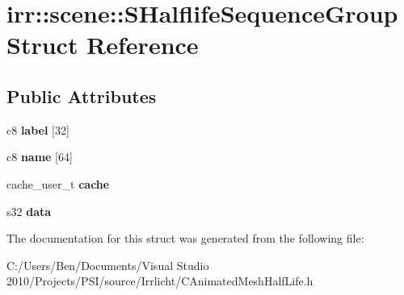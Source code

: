 \hypertarget{structirr_1_1scene_1_1_s_halflife_sequence_group}{\section{irr\-:\-:scene\-:\-:S\-Halflife\-Sequence\-Group Struct Reference}
\label{structirr_1_1scene_1_1_s_halflife_sequence_group}
}
\subsection*{Public Attributes}
\begin{DoxyCompactItemize}
\item 
\hypertarget{structirr_1_1scene_1_1_s_halflife_sequence_group_a7489c571626814da1c0ad6c0d033d3e6}{c8 {\bfseries label} \mbox{[}32\mbox{]}}\label{structirr_1_1scene_1_1_s_halflife_sequence_group_a7489c571626814da1c0ad6c0d033d3e6}

\item 
\hypertarget{structirr_1_1scene_1_1_s_halflife_sequence_group_adfc62ea01b69af2a6615a80af762e618}{c8 {\bfseries name} \mbox{[}64\mbox{]}}\label{structirr_1_1scene_1_1_s_halflife_sequence_group_adfc62ea01b69af2a6615a80af762e618}

\item 
\hypertarget{structirr_1_1scene_1_1_s_halflife_sequence_group_a185915a04865ca83ff2ada96beb50bd1}{cache\-\_\-user\-\_\-t {\bfseries cache}}\label{structirr_1_1scene_1_1_s_halflife_sequence_group_a185915a04865ca83ff2ada96beb50bd1}

\item 
\hypertarget{structirr_1_1scene_1_1_s_halflife_sequence_group_a440513555ef0f3d6264ebac1f145afa2}{s32 {\bfseries data}}\label{structirr_1_1scene_1_1_s_halflife_sequence_group_a440513555ef0f3d6264ebac1f145afa2}

\end{DoxyCompactItemize}


The documentation for this struct was generated from the following file\-:\begin{DoxyCompactItemize}
\item 
C\-:/\-Users/\-Ben/\-Documents/\-Visual Studio 2010/\-Projects/\-P\-S\-I/source/\-Irrlicht/C\-Animated\-Mesh\-Half\-Life.\-h\end{DoxyCompactItemize}
